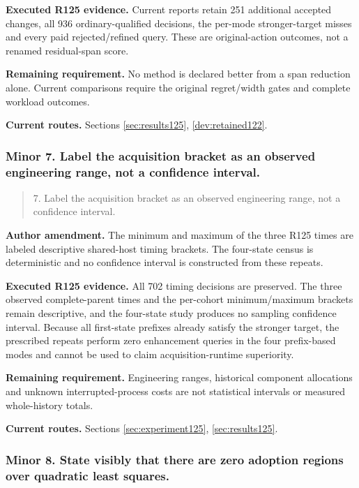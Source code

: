 \noindent\textbf{Executed R125 evidence.} Current reports retain 251 additional accepted changes, all 936 ordinary-qualified decisions, the per-mode stronger-target misses and every paid rejected/refined query. These are original-action outcomes, not a renamed residual-span score.

\noindent\textbf{Remaining requirement.} No method is declared better from a span reduction alone. Current comparisons require the original regret/width gates and complete workload outcomes.

\noindent\textbf{Current routes.} Sections \ref{sec:results125}, \ref{dev:retained122}.

\subsubsection{Minor 7. Label the acquisition bracket as an observed engineering range, not a confidence interval.}

\begin{quote}\small
7. Label the acquisition bracket as an observed engineering range, not a confidence interval.
\end{quote}

\noindent\textbf{Author amendment.} The minimum and maximum of the three R125 times are labeled descriptive shared-host timing brackets. The four-state census is deterministic and no confidence interval is constructed from these repeats.

\noindent\textbf{Executed R125 evidence.} All 702 timing decisions are preserved. The three observed complete-parent times and the per-cohort minimum/maximum brackets remain descriptive, and the four-state study produces no sampling confidence interval. Because all first-state prefixes already satisfy the stronger target, the prescribed repeats perform zero enhancement queries in the four prefix-based modes and cannot be used to claim acquisition-runtime superiority.

\noindent\textbf{Remaining requirement.} Engineering ranges, historical component allocations and unknown interrupted-process costs are not statistical intervals or measured whole-history totals.

\noindent\textbf{Current routes.} Sections \ref{sec:experiment125}, \ref{sec:results125}.

\subsubsection{Minor 8. State visibly that there are zero adoption regions over quadratic least squares.}

